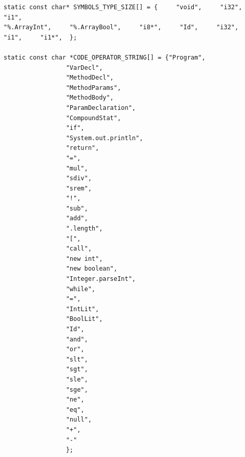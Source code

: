 \documentclass[12pt]{article}
\begin{document}
\begin{lstlisting}
static const char* SYMBOLS_TYPE_SIZE[] = {     "void",     "i32",     "i1",
"%.ArrayInt",     "%.ArrayBool",     "i8*",     "Id",     "i32",
"i1",     "i1*",  };

static const char *CODE_OPERATOR_STRING[] = {"Program",
                 "VarDecl",
                 "MethodDecl",
                 "MethodParams",
                 "MethodBody",
                 "ParamDeclaration",
                 "CompoundStat",
                 "if",
                 "System.out.println",
                 "return",
                 "=",
                 "mul",
                 "sdiv",
                 "srem",
                 "!",
                 "sub",
                 "add",
                 ".length",
                 "[",
                 "call",
                 "new int",
                 "new boolean",
                 "Integer.parseInt",
                 "while",
                 "=",
                 "IntLit",
                 "BoolLit",
                 "Id",
                 "and",
                 "or",
                 "slt",
                 "sgt",
                 "sle",
                 "sge",
                 "ne",
                 "eq",
                 "null",
                 "+",
                 "-"
                 };
\end{lstlisting}
\end{document}
